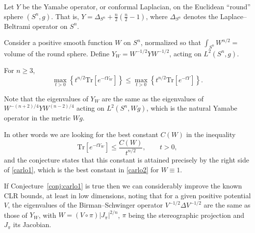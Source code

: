 \documentclass[12pt,letterpaper, reqno]{aimpl}
\begin{document}
\begin{problemblock}
Let $Y$ be the Yamabe operator, or conformal Laplacian, on the
Euclidean ``round'' sphere $(S^n,g)$. That is, $Y = \Delta_{S^n} +
\frac{n}{2} \left( \frac{n}{2}-1 \right)$, where $\Delta_{S^n}$
denotes the Laplace--Beltrami operator on $S^n$.

Consider a positive smooth function $W$ on $S^n$, normalized so that
$\int_{S^n} W^{n/2}=$volume of the round sphere. Define
$Y_W=W^{-1/2}YW^{-1/2}$, acting on $L^2(S^n,g)$.

\begin{conjecture}[2.81] \label{conj:carlo1}
 For $n \geq 3$,
%
\begin{equation} \label{carlo1}
\max_{t>0} \left\{ t^{n/2} \text{Tr}[e^{-tY_W}] \right\} \leq
\max_{t>0} \left\{ t^{n/2} \text{Tr}[e^{-tY}]   \right\} .
\end{equation}
\end{conjecture}

Note that the eigenvalues of $Y_W$ are the same as the eigenvalues
of $W^{-(n+2)/4}Y W^{(n-2)/4}$ acting on $L^2(S^n, W g)$, which is
the natural Yamabe operator in the metric $Wg$.

In other words we are looking for the best constant $C(W)$ in the
inequality
%
\begin{equation} \label{carlo2}
\text{Tr}[e^{-tY_W}] \leq \frac{C(W)}{t^{n/2}},  \qquad t>0,
\end{equation}
%
and the conjecture states that this constant is attained precisely
by the right side of \eqref{carlo1}, which is the best constant in
\eqref{carlo2} for $W \equiv 1$.


\begin{remark}
If Conjecture~\ref{conj:carlo1} is true then we can considerably improve the known
CLR bounds, at least in low dimensions, noting that for a given
positive potential $V$, the eigenvalues of the Birman--Schwinger
operator $V^{-1/2}\Delta V^{-1/2}$ are the same as those of $Y_W$,
with $W=(V\circ\pi) |J_\pi|^{2/n}$, $\pi$ being the stereographic
projection and $J_\pi$ its Jacobian.
\end{remark}
\end{problemblock}
\end{document}

